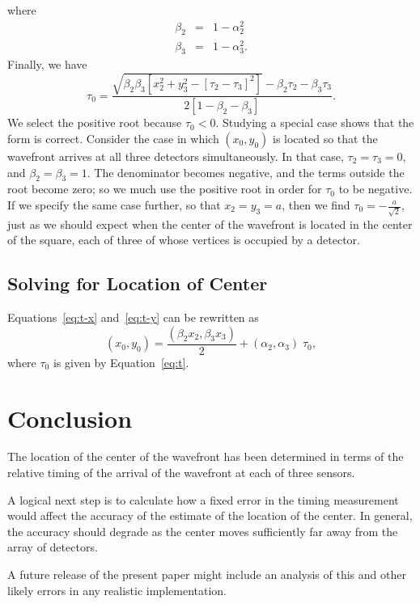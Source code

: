 \documentclass[twocolumn]{article}
\begin{document}
where
\begin{eqnarray}
   \beta_2 &=& 1 - \alpha_2^2\\[5pt]
   \beta_3 &=& 1 - \alpha_3^2.
\end{eqnarray}
Finally, we have
\begin{equation}
   \tau_0 = \frac{ \sqrt{\beta_2 \beta_3 \left[x_2^2 + y_3^2 - \left[\tau_2 -
            \tau_3\right]^2\right]} - \beta_2 \tau_2 - \beta_3 \tau_3 }{2
            \left[1 - \beta_2 - \beta_3\right]}.
   \label{eq:t}
\end{equation}
We select the positive root because $\tau_0 < 0$.  Studying a special case
shows that the form is correct.  Consider the case in which $(x_0, y_0)$ is
located so that the wavefront arrives at all three detectors simultaneously.
In that case, $\tau_2 = \tau_3 = 0$, and $\beta_2 = \beta_3 = 1$.  The
denominator becomes negative, and the terms outside the root become zero; so we
much use the positive root in order for $\tau_0$ to be negative.  If we specify
the same case further, so that $x_2 = y_3 = a$, then we find $\tau_0 =
-\frac{a}{\sqrt{2}}$, just as we should expect when the center of the wavefront
is located in the center of the square, each of three of whose vertices is
occupied by a detector.

\subsection{Solving for Location of Center}

Equations~\ref{eq:t-x} and~\ref{eq:t-y} can be rewritten as
\begin{equation}
   (x_0, y_0) = \frac{(\beta_2 x_2, \beta_3 x_3)}{2} + (\alpha_2, \alpha_3) \;
                \tau_0,
\end{equation}
where $\tau_0$ is given by Equation~\ref{eq:t}.

\section{Conclusion}

The location of the center of the wavefront has been determined in terms of the
relative timing of the arrival of the wavefront at each of three sensors.

A logical next step is to calculate how a fixed error in the timing measurement
would affect the accuracy of the estimate of the location of the center.  In
general, the accuracy should degrade as the center moves sufficiently far away
from the array of detectors.

A future release of the present paper might include an analysis of this and
other likely errors in any realistic implementation.

%
%
%
%

\newpage


\end{document}
